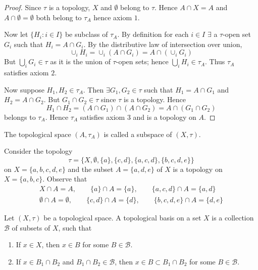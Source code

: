 \begin{proof}
Since $\tau$ is a topology, $X$ and $\emptyset$  belong to $\tau$. Hence $A\cap X=A$ and $A \cap \emptyset=\emptyset$ both belong to $\tau_A$ hence axiom $1$.

Now let $\{H_i: i\in I\}$ be subclass of $\tau_A$. By definition for each $i\in I$ $ \exists $ a $\tau$-open set $G_i$ such that $H_i=A\cap G_i$. By the distributive law of intersection over union,
$$\cup_iH_i=\cup_i(A\cap G_i)=A\cap(\cup_iG_i)$$
But $\bigcup_iG_i\in \tau$ as it is the union of $\tau$-open sets; hence $\bigcup_iH_i\in \tau_A$. Thus $\tau_A$ satisfies axiom $2$.

Now suppose $H_1,H_2 \in \tau_A$. Then $\exists G_1,G_2\in \tau$ such that $H_1=A\cap G_1$ and $H_2=A\cap G_2$. But $G_1\cap G_2\in \tau$ since $\tau$ is a topology. Hence
$$H_1\cap H_2=(A\cap G_1)\cap(A\cap G_2)=A\cap(G_1\cap G_2)$$
belongs to $\tau_A$. Hence $\tau_A$ satisfies axiom $3$ and is a topology on $A$.
\end{proof}

\begin{definition}
The topological space $(A,\tau_A)$ is called a subspace of $(X,\tau)$.
\end{definition}

\begin{example}
Consider the topology
$$\tau=\{X,\emptyset,\{a\},\{c,d\},\{a,c,d\},\{b,c,d,e\}\}$$
on $X=\{a,b,c,d,e\}$ and the subset $A=\{a,d,e\}$ of $X$ is a topology on $X=\{a,b,c\}$. Observe that
\begin{align*}
X\cap A=A, \qquad \{a\}\cap A=\{a\}, \qquad \{a,c,d\}\cap A=\{a,d\} \\
\emptyset\cap A=\emptyset, \qquad \{c,d\}\cap A=\{d\}, \qquad \{b,c,d,e\}\cap A=\{d,e\}
\end{align*}
\end{example}

\begin{definition}
Let $(X,\tau)$ be a topological space. A topological basis on a set $X$ is a collection $\mathcal{B}$ of subsets of $X$, such that
\begin{enumerate}
  \item If $x\in X$, then $x\in B$ for some $B\in \mathcal{B}$.
  \item If $x\in B_1\cap B_2$ and $B_1\cap B_2\in \mathcal{B}$, then $x\in B\subset B_1\cap B_2$ for some $B\in \mathcal{B}.$
\end{enumerate}
\end{definition}

